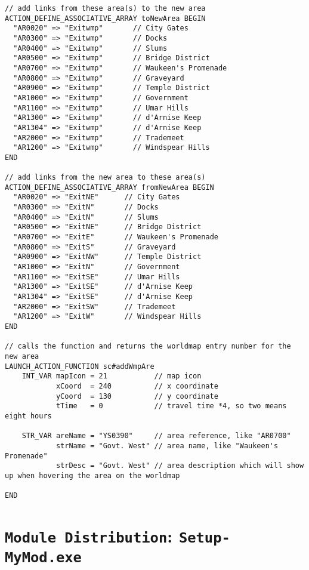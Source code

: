 \documentclass{article}
\def\DEFINE#1{{\tt \bf #1}\label{#1}\index{#1}}
\def\t#1{{\tt #1}}
\begin{document}
\begin{verbatim}
// add links from these area(s) to the new area
ACTION_DEFINE_ASSOCIATIVE_ARRAY toNewArea BEGIN
  "AR0020" => "Exitwmp"       // City Gates
  "AR0300" => "Exitwmp"       // Docks
  "AR0400" => "Exitwmp"       // Slums
  "AR0500" => "Exitwmp"       // Bridge District
  "AR0700" => "Exitwmp"       // Waukeen's Promenade
  "AR0800" => "Exitwmp"       // Graveyard
  "AR0900" => "Exitwmp"       // Temple District
  "AR1000" => "Exitwmp"       // Government
  "AR1100" => "Exitwmp"       // Umar Hills
  "AR1300" => "Exitwmp"       // d'Arnise Keep
  "AR1304" => "Exitwmp"       // d'Arnise Keep
  "AR2000" => "Exitwmp"       // Trademeet
  "AR1200" => "Exitwmp"       // Windspear Hills
END

// add links from the new area to these area(s)
ACTION_DEFINE_ASSOCIATIVE_ARRAY fromNewArea BEGIN
  "AR0020" => "ExitNE"      // City Gates
  "AR0300" => "ExitN"       // Docks
  "AR0400" => "ExitN"       // Slums
  "AR0500" => "ExitNE"      // Bridge District
  "AR0700" => "ExitE"       // Waukeen's Promenade
  "AR0800" => "ExitS"       // Graveyard
  "AR0900" => "ExitNW"      // Temple District
  "AR1000" => "ExitN"       // Government
  "AR1100" => "ExitSE"      // Umar Hills
  "AR1300" => "ExitSE"      // d'Arnise Keep
  "AR1304" => "ExitSE"      // d'Arnise Keep
  "AR2000" => "ExitSW"      // Trademeet
  "AR1200" => "ExitW"       // Windspear Hills
END

// calls the function and returns the worldmap entry number for the new area
LAUNCH_ACTION_FUNCTION sc#addWmpAre
    INT_VAR mapIcon = 21           // map icon
            xCoord  = 240          // x coordinate
            yCoord  = 130          // y coordinate
            tTime   = 0            // travel time *4, so two means eight hours

    STR_VAR areName = "YS0390"     // area reference, like "AR0700"
            strName = "Govt. West" // area name, like "Waukeen's Promenade"
            strDesc = "Govt. West" // area description which will show up when hovering the area on the worldmap

END
\end{verbatim}

\section{\DEFINE{Module Distribution}: \t{Setup-MyMod.exe}}
\end{document}
